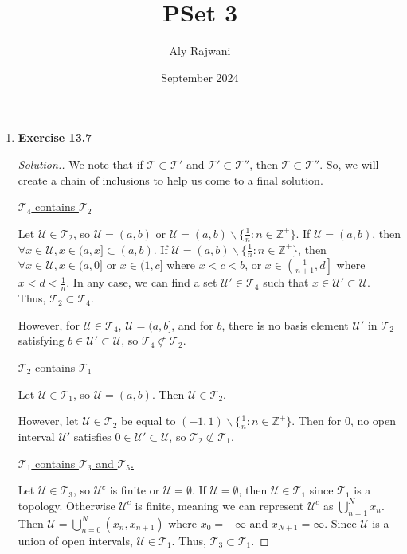 \documentclass{article}
\title{PSet 3}
\author{Aly Rajwani}
\date{September 2024}
\newcommand{\T}{\mathcal{T}}
\newcommand{\U}{\mathcal{U}}
\newcommand{\Z}{\mathbb{Z}}
\newcommand{\sk}{\smallskip}
\begin{document}
\maketitle

\begin{enumerate}
    \item \textbf{Exercise 13.7}
    \begin{proof}[Solution.]
        We note that if $\T \subset \T'$ and $\T' \subset \T''$, then $\T \subset \T''$. So, we will create a chain of inclusions to help us come to a final solution. 

        \sk
        
        \underline{$\T_4$ contains $\T_2$} 

        Let $\U \in \T_2$, so $\U = (a, b)$ or $\U = (a, b) \backslash \{\frac{1}{n} : n \in \Z^+\}$. If $\U = (a, b)$, then $\forall x \in \U, x \in (a, x] \subset (a, b)$. If $\U = (a, b) \backslash \{\frac{1}{n} : n \in \Z^+\}$, then $\forall x \in \U, x \in (a, 0]$ or $x \in (1, c]$ where $x < c < b$, or $x \in \left(\frac{1}{n+1}, d\right]$ where $x < d < \frac{1}{n}$. In any case, we can find a set $\U' \in \T_4$ such that $x \in \U' \subset \U$. Thus, $\T_2 \subset \T_4$. 

        \sk

        However, for $\U \in \T_4$, $\U = (a, b]$, and for $b$, there is no basis element $\U'$ in $\T_2$ satisfying $b \in \U' \subset \U$, so $\T_4 \not\subset \T_2$. 

        \sk

        \underline{$\T_2$ contains $\T_1$}

        \sk 

        Let $\U \in \T_1$, so $\U = (a, b)$. Then $\U \in \T_2$. 

        \sk

        However, let $\U \in \T_2$ be equal to $(-1, 1) \backslash \{\frac{1}{n} : n \in \Z^+\}$. Then for $0$, no open interval $\U'$ satisfies $0 \in \U' \subset \U$, so $\T_2 \not\subset \T_1$. 
      
        \underline{$\T_1$ contains $\T_3$ and $\T_5$.} 

        \sk
        
        Let $\U \in \T_3$, so $\U^c$ is finite or $\U = \emptyset$. If $\U = \emptyset$, then $\U \in \T_1$ since $\T_1$ is a topology. Otherwise $\U^c$ is finite, meaning we can represent $\U^c$ as $\bigcup_{n=1}^N x_n$. Then $\U = \bigcup_{n=0}^N (x_n, x_{n+1})$ where $x_0 = -\infty$ and $x_{N+1} = \infty$. Since $\U$ is a union of open intervals, $\U \in \T_1$. Thus, $\T_3 \subset \T_1$. 


\end{proof}
\end{enumerate}
\end{document}
